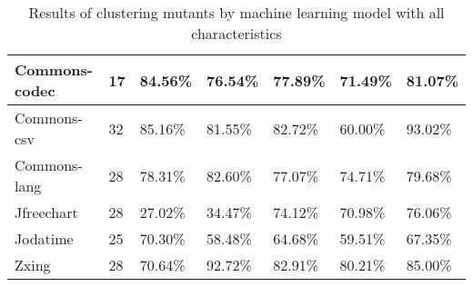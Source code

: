 \documentclass[../../main]{subfiles}
\begin{document}
\begin{table}[!htb]
\begin{tabular}{|l|l|l|l|l|l|l|}
Commons-codec         & 17                                                              & 84.56\%                                                              & 76.54\%                                                                    & 77.89\%                                                               & 71.49\%                                                            & 81.07\%                                                            \\ \hline
Commons-csv           & 32                                                              & 85.16\%                                                              & 81.55\%                                                                    & 82.72\%                                                               & 60.00\%                                                            & 93.02\%                                                            \\ \hline
Commons-lang          & 28                                                              & 78.31\%                                                              & 82.60\%                                                                    & 77.07\%                                                               & 74.71\%                                                            & 79.68\%                                                            \\ \hline
Jfreechart            & 28                                                              & 27.02\%                                                              & 34.47\%                                                                    & 74.12\%                                                               & 70.98\%                                                            & 76.06\%                                                            \\ \hline
Jodatime              & 25                                                              & 70.30\%                                                              & 58.48\%                                                                    & 64.68\%                                                               & 59.51\%                                                            & 67.35\%                                                            \\ \hline
Zxing                 & 28                                                              & 70.64\%                                                              & 92.72\%                                                                    & 82.91\%                                                               & 80.21\%                                                            & 85.00\%                                                            \\ \hline
\end{tabular}
\caption{\label{tab:ml_no_distance}Results of clustering mutants by machine learning model with all characteristics}
\end{table}
\end{document}
